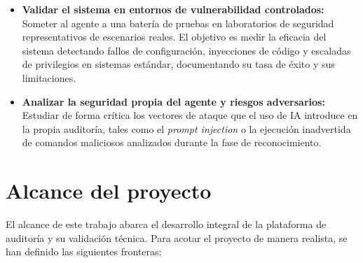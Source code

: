 \begin{itemize}
    \item \textbf{Validar el sistema en entornos de vulnerabilidad controlados:} Someter al agente a una batería de pruebas en laboratorios de seguridad representativos de escenarios reales. El objetivo es medir la eficacia del sistema detectando fallos de configuración, inyecciones de código y escaladas de privilegios en sistemas estándar, documentando su tasa de éxito y sus limitaciones.
    
    \item \textbf{Analizar la seguridad propia del agente y riesgos adversarios:} Estudiar de forma crítica los vectores de ataque que el uso de IA introduce en la propia auditoría, tales como el \textit{prompt injection} o la ejecución inadvertida de comandos maliciosos analizados durante la fase de reconocimiento.
\end{itemize}

\section{Alcance del proyecto}
\label{sec:alcance}

El alcance de este trabajo abarca el desarrollo integral de la plataforma de auditoría y su validación técnica. Para acotar el proyecto de manera realista, se han definido las siguientes fronteras:

